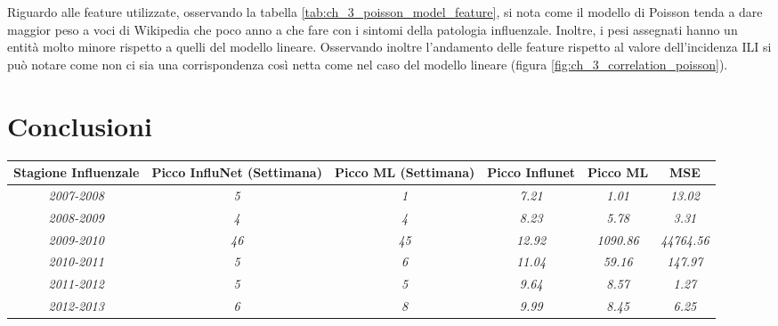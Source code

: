 Riguardo alle feature utilizzate, osservando la tabella \ref{tab:ch_3_poisson_model_feature}, si nota come il modello di Poisson tenda a dare maggior peso a voci di Wikipedia che poco anno a che fare con i sintomi della patologia influenzale. Inoltre, i pesi assegnati hanno un entità molto minore rispetto a quelli del modello lineare. Osservando inoltre l'andamento delle feature rispetto al valore dell'incidenza ILI si può notare come non ci sia una corrispondenza così netta come nel caso del modello lineare (figura \ref{fig:ch_3_correlation_poisson}).
\bigskip

\section{Conclusioni}

\begin{table}[p]
\centering 
\begin{adjustbox}{max width=\textwidth}
\begin{tabular}{|c|c|c|c|c|c|}
\hline
\rowcolor[HTML]{EFEFEF} 
\textbf{Stagione Influenzale} & \textbf{Picco InfluNet (Settimana)} & \textbf{Picco ML (Settimana)} & \textbf{Picco Influnet} & \textbf{Picco ML} & \textbf{MSE}      \\ \hline
\textit{2007-2008}            & \textit{5}                          & \textit{1}                    & \textit{7.21}           & \textit{1.01}     & \textit{13.02}    \\ \hline
\rowcolor[HTML]{FFFFFF} 
\textit{2008-2009}            & \textit{4}                          & \textit{4}                    & \textit{8.23}           & \textit{5.78}     & \textit{3.31}     \\ \hline
\rowcolor[HTML]{FFFFFF} 
\textit{2009-2010}            & \textit{46}                         & \textit{45}                   & \textit{12.92}          & \textit{1090.86}  & \textit{44764.56} \\ \hline
\rowcolor[HTML]{FFFFFF} 
\textit{2010-2011}            & \textit{5}                          & \textit{6}                    & \textit{11.04}          & \textit{59.16}    & \textit{147.97}   \\ \hline
\rowcolor[HTML]{FFFFFF} 
\textit{2011-2012}            & \textit{5}                          & \textit{5}                    & \textit{9.64}           & \textit{8.57}     & \textit{1.27}     \\ \hline
\rowcolor[HTML]{FFFFFF} 
\textit{2012-2013}            & \textit{6}                          & \textit{8}                    & \textit{9.99}           & \textit{8.45}     & \textit{6.25}     \\ \hline

\end{tabular}
\end{adjustbox}
\end{table}
